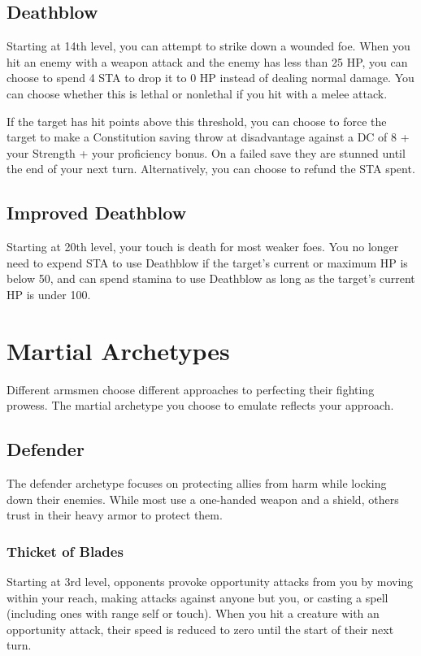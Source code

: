 \subsection{Deathblow}
Starting at 14th level, you can attempt to strike down a wounded foe. When you hit an enemy with a weapon attack and the enemy has less than 25 HP, you can choose to spend 4 STA to drop it to 0 HP instead of dealing normal damage. You can choose whether this is lethal or nonlethal if you hit with a melee attack.

If the target has hit points above this threshold, you can choose to force the target to make a Constitution saving throw at disadvantage against a DC of 8 + your Strength + your proficiency bonus. On a failed save they are stunned until the end of your next turn. Alternatively, you can choose to refund the STA spent.

\subsection{Improved Deathblow}
Starting at 20th level, your touch is death for most weaker foes. You no longer need to expend STA to use Deathblow if the target's current or maximum HP is below 50, and can spend stamina to use Deathblow as long as the target's current HP is under 100.

\section{Martial Archetypes}

Different armsmen choose different approaches to perfecting their fighting prowess. The martial archetype you choose to emulate reflects your approach.

\subsection{Defender}
The defender archetype focuses on protecting allies from harm while locking down their enemies. While most use a one-handed weapon and a shield, others trust in their heavy armor to protect them.

\subsubsection{Thicket of Blades}
Starting at 3rd level, opponents provoke opportunity attacks from you by moving within your reach, making attacks against anyone but you, or casting a spell (including ones with range self or touch). When you hit a creature with an opportunity attack, their speed is reduced to zero until the start of their next turn.

